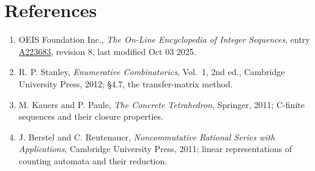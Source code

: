 \documentclass[11pt]{article}
\theoremstyle{definition}
\begin{document}
\section{References}

\begin{enumerate}

\item OEIS Foundation Inc., \emph{The On-Line Encyclopedia of Integer Sequences}, entry \href{https://oeis.org/A223683}{A223683}, revision 8, last modified Oct 03 2025.

\item R. P. Stanley, \emph{Enumerative Combinatorics}, Vol.~1, 2nd ed., Cambridge University Press, 2012; \S4.7, the transfer-matrix method.

\item M. Kauers and P. Paule, \emph{The Concrete Tetrahedron}, Springer, 2011; C-finite sequences and their closure properties.

\item J. Berstel and C. Reutenauer, \emph{Noncommutative Rational Series with Applications}, Cambridge University Press, 2011; linear representations of counting automata and their reduction.

\end{enumerate}
\end{document}
